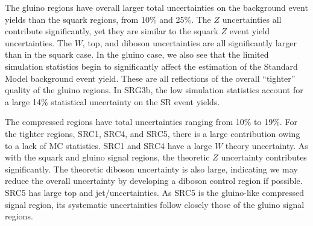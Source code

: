 The gluino regions have overall larger total uncertainties on the background event yields than the squark regions, from 10\% and 25\%.
The $Z$ uncertainties all contribute significantly, yet they are similar to the squark $Z$ event yield uncertainties.
The $W$, top, and diboson uncertainties are all significantly larger than in the squark case.
In the gluino case, we also see that the limited simulation statistics begin to significantly affect the estimation of the Standard Model background event yield.
These are all reflections of the overall ``tighter'' quality of the gluino regions.
In SRG3b, the low simulation statistics account for a large 14\% statistical uncertainty on the SR event yields.

The compressed regions have total uncertainties ranging from 10\% to 19\%.
For the tighter regions, SRC1, SRC4, and SRC5, there is a large contribution owing to a lack of MC statistics.
SRC1 and SRC4 have a large $W$ theory uncertainty.
As with the squark and gluino signal regions, the theoretic $Z$ uncertainty contributes significantly.
The theoretic diboson uncertainty is also large, indicating we may reduce the overall uncertainty by developing a diboson control region if possible.
SRC5 has large top and jet/\met uncertainties.
As SRC5 is the gluino-like compressed signal region, its systematic uncertainties follow closely those of the gluino signal regions.



